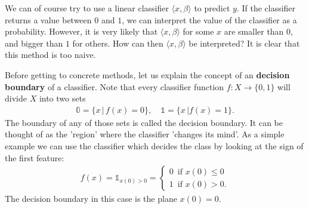 \documentclass{article}
\newcommand{\sprod}[1]{\langle #1 \rangle}
\newcommand{\one}{\mathds{1}}
\begin{document}
We can of course try to use a linear classifier $\sprod{x,\beta}$ to predict $y$. If the classifier returns a value between $0$ and $1$, we can interpret the value of the classifier as a probability. However, it is very likely that $\sprod{x,\beta}$ for some $x$ are smaller than $0$, and bigger than $1$ for others. How can then $\sprod{x,\beta}$ be interpreted? It is clear that this method is too naive.

Before getting to concrete methods, let us explain the concept of an \textbf{decision boundary} of a classifier. Note that every classifier function $f: X \to \{0,1\}$ will divide $X$ into two sets
\begin{align*}
    \mathds{0} = \{x \, \vert \,  f(x)=0\} , \quad \mathds{1} = \{x \, \vert f(x)=1\}.
\end{align*}
The boundary of any of those sets is called the decision boundary. It can be thought of as the 'region' where the classifier 'changes its mind'. As a simple example we can use the classifier which decides the class by looking at the sign of the first feature:
\begin{align*}
    f(x)  = \one_{x(0)>0} =  \begin{cases}
        0 \, \text{ if } x(0)\leq 0 \\
        1 \, \text{ if } x(0)>0.
    \end{cases}
\end{align*}
The decision boundary in this case is the plane $x(0)=0$.
\end{document}
